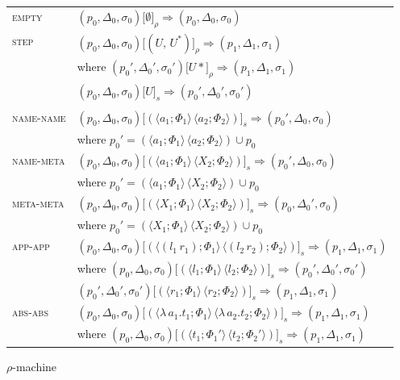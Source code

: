 \documentclass[a4paper,UKenglish]{lipics-v2016}
\newcommand{\clos}[2] {
  \langle #1; #2 \rangle
}
\newcommand{\app}[2] {
  (#1\, #2)
}
\newcommand{\rframe}[7] {
  (#1, #2, #3) \lbrack #4 \rbrack_\rho\Rightarrow (#5, #6, #7)
}
\newcommand{\cframe}[7] {
  (#1, #2, #3) \lbrack #4 \rbrack_s\Rightarrow (#5, #6, #7)
}
\newcommand{\pr}[2] {
 (#1\, #2)
}
\newcommand*{\transname}[1]{\textsc{#1}}
\begin{document}
      \begin{wrapfigure}{r}{0.5\textwidth}
  \caption{$\rho$-machine}\label{table:rmachine}
  \begin{tabular}{l l}
    \transname{empty} & $\rframe{p_0}{\Delta_0}{\sigma_0}{\emptyset}{p_0}{\Delta_0}{\sigma_0}$ \\
    \transname{step} & $\rframe{p_0}{\Delta_0}{\sigma_0}{(U,\,U^*)}{p_1}{\Delta_1}{\sigma_1}$ \\
                          & where $\rframe{p_0'}{\Delta_0'}{\sigma_0'}{U*}{p_1}{\Delta_1}{\sigma_1}$ \\
                          & \hspace{8mm} $\cframe{p_0}{\Delta_0}{\sigma_0}{U}{p_0'}{\Delta_0'}{\sigma_0'}$ \\
                      & \\
    \transname{name-name} & $\cframe{p_0}{\Delta_0}{\sigma_0}{\pr{\clos{a_1}{\Phi_1}}{\clos{a_2}{\Phi_2}}}{p_0'}{\Delta_0}{\sigma_0}$ \\
                          & where $p_0' = {\pr{\clos{a_1}{\Phi_1}}{\clos{a_2}{\Phi_2}}} \cup p_0$  \\
    \transname{name-meta} & $\cframe{p_0}{\Delta_0}{\sigma_0}{\pr{\clos{a_1}{\Phi_1}}{\clos{X_2}{\Phi_2}}}{p_0'}{\Delta_0}{\sigma_0}$ \\
                          & where $p_0' = {\pr{\clos{a_1}{\Phi_1}}{\clos{X_2}{\Phi_2}}} \cup p_0$  \\
    \transname{meta-meta} & $\cframe{p_0}{\Delta_0}{\sigma_0}{\pr{\clos{X_1}{\Phi_1}}{\clos{X_2}{\Phi_2}}}{p_0}{\Delta_0'}{\sigma_0}$ \\
                          & where $p_0' = {\pr{\clos{X_1}{\Phi_1}}{\clos{X_2}{\Phi_2}}} \cup p_0$  \\
    \transname{app-app} & $\cframe{p_0}{\Delta_0}{\sigma_0}{\pr{\clos{\app{l_1}{r_1}}{\Phi_1}}{\clos{\app{l_2}{r_2}}{\Phi_2}}}{p_1}{\Delta_1}{\sigma_1}$ \\ 
    & where $\cframe{p_0}{\Delta_0}{\sigma_0}{\pr{\clos{l_1}{\Phi_1}}{\clos{l_2}{\Phi_2}}}{p_0'}{\Delta_0'}{\sigma_0'}$ \\
    & \hspace{8mm} $\cframe{p_0'}{\Delta_0'}{\sigma_0'}{\pr{\clos{r_1}{\Phi_1}}{\clos{r_2}{\Phi_2}}}{p_1}{\Delta_1}{\sigma_1}$ \\
    \transname{abs-abs} & $\cframe{p_0}{\Delta_0}{\sigma_0}{\pr{\clos{\lambda\,a_1.t_1}{\Phi_1}}{\clos{\lambda\,a_2.t_2}{\Phi_2}}}{p_1}{\Delta_1}{\sigma_1}$ \\ 
    & where $\cframe{p_0}{\Delta_0}{\sigma_0}{\pr{\clos{t_1}{\Phi_1'}}{\clos{t_2}{\Phi_2'}}}{p_1}{\Delta_1}{\sigma_1}$ \\

\end{tabular}
\end{wrapfigure}
\end{document}
